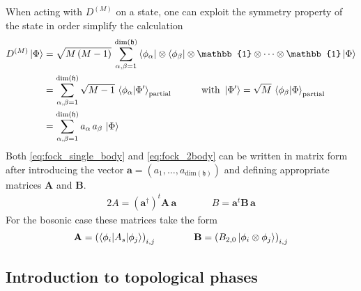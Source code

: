 When acting with $D^{(M)}$ on a state, one can exploit the symmetry property of the state in order simplify the calculation%
\begin{align*}
    D^{(M)}\ket{\Phi}&=\sqrt{M\,(M-1)}\,\sum_{\alpha,\beta=1}^{\text{dim}(\mathfrak{h})}\bra{\phi_\alpha}\otimes\bra{\phi_\beta}\otimes\mathbb{1}\otimes\cdots\otimes\mathbb{1}\ket{\Phi}\\
    &=\sum_{\alpha,\beta=1}^{\text{dim}(\mathfrak{h})}\sqrt{M-1}\,\braket{\phi_\alpha|\Phi'}_\text{partial}\quad \quad\quad\text{with }\ket{\Phi'}=\sqrt{M}\,\braket{\phi_\beta|\Phi}_\text{partial}\\
    &=\sum_{\alpha,\beta=1}^{\text{dim}(\mathfrak{h})} a_\alpha\,a_\beta\,\ket{\Phi}
\end{align*}
Both \eqref{eq:fock_single_body} and \eqref{eq:fock_2body} can be written in matrix form after introducing the vector $\mathbf{a}=(a_1,\dots,a_{\text{dim}(\mathfrak{h})})$ and defining appropriate matrices $\mathbf{A}$ and $\mathbf{B}$.
\begin{alignat*}{2}
    A = (\mathbf{a}^\dagger)^t\mathbf{A}\,\mathbf{a}\quad\quad&&B = \mathbf{a}^t\mathbf{B}\,\mathbf{a}
\end{alignat*}
For the bosonic case these matrices take the form
\begin{alignat*}{2}
    \mathbf{A}=\left(\braket{\phi_i|A_s|\phi_j}\right)_{i,j}\quad\quad\quad&&\mathbf{B}=\left(B_{2,0}\ket{\phi_{i}\otimes \phi_{j}}\right)_{i,j}%
\end{alignat*}





\subsection{Introduction to topological phases}
